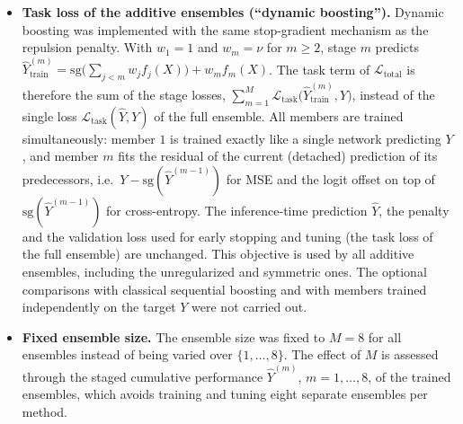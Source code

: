 \documentclass[11pt, a4paper]{article}
\begin{document}
\begin{itemize}
    \item \textbf{Task loss of the additive ensembles (``dynamic boosting'').} Dynamic boosting was implemented with the same stop-gradient mechanism as the repulsion penalty. With $w_1 = 1$ and $w_m = \nu$ for $m \ge 2$, stage $m$ predicts $\hat{Y}^{(m)}_{\text{train}} = \text{sg}\big(\sum_{j<m} w_j f_j(X)\big) + w_m f_m(X)$. The task term of $\mathcal{L}_{\text{total}}$ is therefore the sum of the stage losses, $\sum_{m=1}^{M} \mathcal{L}_{\text{task}}\big(\hat{Y}^{(m)}_{\text{train}}, Y\big)$, instead of the single loss $\mathcal{L}_{\text{task}}(\hat{Y}, Y)$ of the full ensemble. All members are trained simultaneously: member $1$ is trained exactly like a single network predicting $Y$, and member $m$ fits the residual of the current (detached) prediction of its predecessors, i.e.\ $Y - \text{sg}(\hat{Y}^{(m-1)})$ for MSE and the logit offset on top of $\text{sg}(\hat{Y}^{(m-1)})$ for cross-entropy. The inference-time prediction $\hat{Y}$, the penalty and the validation loss used for early stopping and tuning (the task loss of the full ensemble) are unchanged. This objective is used by all additive ensembles, including the unregularized and symmetric ones. The optional comparisons with classical sequential boosting and with members trained independently on the target $Y$ were not carried out.
    \item \textbf{Fixed ensemble size.} The ensemble size was fixed to $M = 8$ for all ensembles instead of being varied over $\{1, \dots, 8\}$. The effect of $M$ is assessed through the staged cumulative performance $\hat{Y}^{(m)}$, $m = 1, \dots, 8$, of the trained ensembles, which avoids training and tuning eight separate ensembles per method.
\end{itemize}
\end{document}
